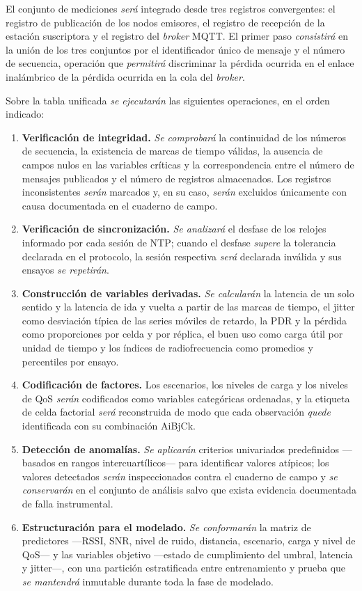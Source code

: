 \documentclass[
  12pt,
]{article}
\providecommand{\tightlist}{%
  \setlength{\itemsep}{0pt}\setlength{\parskip}{0pt}}
\begin{document}
El conjunto de mediciones \emph{será} integrado desde tres registros
convergentes: el registro de publicación de los nodos emisores, el
registro de recepción de la estación suscriptora y el registro del
\emph{broker} MQTT. El primer paso \emph{consistirá} en la unión de los
tres conjuntos por el identificador único de mensaje y el número de
secuencia, operación que \emph{permitirá} discriminar la pérdida
ocurrida en el enlace inalámbrico de la pérdida ocurrida en la cola del
\emph{broker}.

Sobre la tabla unificada \emph{se ejecutarán} las siguientes
operaciones, en el orden indicado:

\begin{enumerate}
\def\labelenumi{\arabic{enumi}.}
\tightlist
\item
  \textbf{Verificación de integridad.} \emph{Se comprobará} la
  continuidad de los números de secuencia, la existencia de marcas de
  tiempo válidas, la ausencia de campos nulos en las variables críticas
  y la correspondencia entre el número de mensajes publicados y el
  número de registros almacenados. Los registros inconsistentes
  \emph{serán} marcados y, en su caso, \emph{serán} excluidos únicamente
  con causa documentada en el cuaderno de campo.
\item
  \textbf{Verificación de sincronización.} \emph{Se analizará} el
  desfase de los relojes informado por cada sesión de NTP; cuando el
  desfase \emph{supere} la tolerancia declarada en el protocolo, la
  sesión respectiva \emph{será} declarada inválida y sus ensayos
  \emph{se repetirán}.
\item
  \textbf{Construcción de variables derivadas.} \emph{Se calcularán} la
  latencia de un solo sentido y la latencia de ida y vuelta a partir de
  las marcas de tiempo, el jitter como desviación típica de las series
  móviles de retardo, la PDR y la pérdida como proporciones por celda y
  por réplica, el buen uso como carga útil por unidad de tiempo y los
  índices de radiofrecuencia como promedios y percentiles por ensayo.
\item
  \textbf{Codificación de factores.} Los escenarios, los niveles de
  carga y los niveles de QoS \emph{serán} codificados como variables
  categóricas ordenadas, y la etiqueta de celda factorial \emph{será}
  reconstruida de modo que cada observación \emph{quede} identificada
  con su combinación AiBjCk.
\item
  \textbf{Detección de anomalías.} \emph{Se aplicarán} criterios
  univariados predefinidos —basados en rangos intercuartílicos— para
  identificar valores atípicos; los valores detectados \emph{serán}
  inspeccionados contra el cuaderno de campo y \emph{se conservarán} en
  el conjunto de análisis salvo que exista evidencia documentada de
  falla instrumental.
\item
  \textbf{Estructuración para el modelado.} \emph{Se conformarán} la
  matriz de predictores —RSSI, SNR, nivel de ruido, distancia,
  escenario, carga y nivel de QoS— y las variables objetivo —estado de
  cumplimiento del umbral, latencia y jitter—, con una partición
  estratificada entre entrenamiento y prueba que \emph{se mantendrá}
  inmutable durante toda la fase de modelado.
\end{enumerate}
\end{document}
